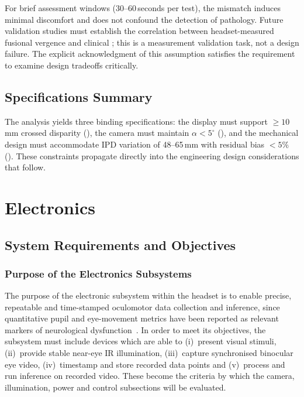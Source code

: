 For brief assessment windows (30--60\,seconds per test), the mismatch induces minimal discomfort and does not confound the detection of pathology. Future validation studies must establish the correlation between headset-measured fusional vergence and clinical ; this is a measurement validation task, not a design failure. The explicit acknowledgment of this assumption satisfies the requirement to examine design tradeoffs critically.


\subsection{Specifications Summary}
\label{sec:hw-vergence-specs}

The analysis yields three binding specifications: the display must support $\geq 10$\,mm crossed disparity (), the camera must maintain $\alpha < 5^{\circ}$ (), and the mechanical design must accommodate IPD variation of 48--65\,mm with residual bias $< 5\%$ (). These constraints propagate directly into the engineering design considerations that follow.


\section{Electronics}
\label{sec:electronics}


\subsection{System Requirements and Objectives}
\label{sec:electronics-requirements}

\subsubsection{Purpose of the Electronics Subsystems}

The purpose of the electronic subsystem within the headset is to enable precise, repeatable and time-stamped oculomotor data collection and inference, since quantitative pupil and eye-movement metrics have been reported as relevant markers of neurological dysfunction~\cite{mcdonald2022eye}. In order to meet its objectives, the subsystem must include devices which are able to (i)~present visual stimuli, (ii)~provide stable near-eye IR illumination, (iii)~capture synchronised binocular eye video, (iv)~timestamp and store recorded data points and (v)~process and run inference on recorded video. These become the criteria by which the camera, illumination, power and control subsections will be evaluated.

